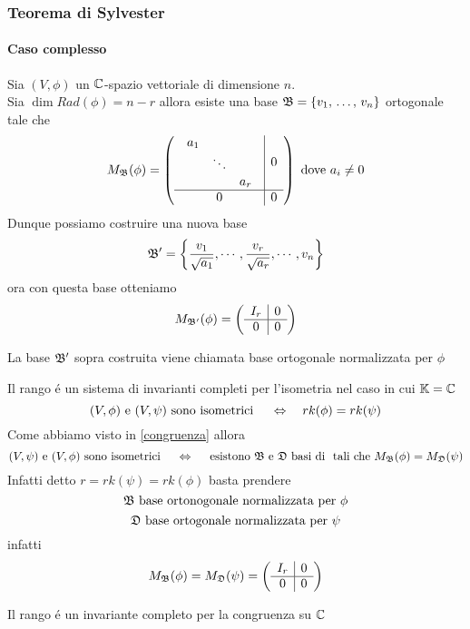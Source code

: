 \subsubsection{Teorema di Sylvester}
\paragraph{Caso complesso}
Sia $(V,\phi) $ un $\mathbb{C}$-spazio vettoriale di dimensione $n$.\\
Sia $\dim Rad (\phi)= n-r $ allora esiste una base $\mathfrak{B}=\{ v_1, \, \dots , \, v_n \}$ ortogonale tale che 
$$ M_{\mathfrak{B}}(\phi) = \left( \begin{array}{c|c}
\begin{array}{ccc}
a_1 & & \\
 & \ddots &  \\
& & a_r 
\end{array}  &0 \\ \hline 0&0
\end{array}\right)  \text{ dove } a_i \neq 0$$
Dunque possiamo costruire una nuova base
$$ \mathfrak{B}'=\left\{ \frac{v_1}{\sqrt{a_1}} , \cdots , \frac{v_r}{\sqrt{a_r}}, \cdots , v_n \right\} $$ 
ora con questa base   otteniamo
$$ M_{\mathfrak{B}'}(\phi) = \left( \begin{array}{c|c}I_r & 0 \\ \hline 0&0
\end{array} \right)$$
\begin{defn}La base $\mathfrak{B}'$ sopra costruita viene chiamata base ortogonale normalizzata per $\phi$
\end{defn}
\spazio
\begin{thm}\bianco
Il rango \'e un sistema di invarianti completi per l'isometria nel caso in cui $\mathbb{K}=\mathbb{C}$
$$ (V, \phi) \text{ e } (V, \psi) \text{ sono isometrici } \quad \Leftrightarrow \quad rk(\phi) = rk(\psi)$$
\proof Come abbiamo visto in \ref{congruenza} allora 
$$ (V,\psi) \text{ e } (V, \phi) \text { sono isometrici } \quad \Leftrightarrow \quad \text{ esistono } \mathfrak{B} \text{ e } \mathfrak{D} \text{ basi di } \text{ tali che }  M_{\mathfrak{B}} (\phi) = M_{\mathfrak{D}}(\psi)$$
Infatti detto $r=rk(\psi ) = rk(\phi ) $ basta prendere   
$$ \mathfrak{B} \text{ base ortonogonale normalizzata per } \phi $$ 
$$ \mathfrak{D} \text{ base ortogonale normalizzata per } \psi $$ 
infatti
$$ M_{\mathfrak{B}} ( \phi) = M_{\mathfrak{D}}(\psi) =  \left( \begin{array}{c|c}I_r & 0 \\ \hline 0&0 
\end{array} \right)$$ 
\endproof
\end{thm}
\begin{cor}Il rango \'e un invariante completo per la congruenza  su $\mathbb{C}$
\end{cor}
\newpage
